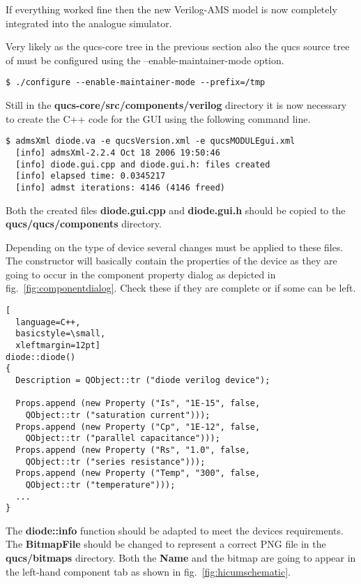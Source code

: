 \addvspace{12pt}

If everything worked fine then the new Verilog-AMS model is now
completely integrated into the analogue simulator.


Very likely as the qucs-core tree in the previous section also the
qucs source tree of must be configured using the
--enable-maintainer-mode option.
\begin{Verbatim}[fontsize=\small]
  $ ./configure --enable-maintainer-mode --prefix=/tmp
\end{Verbatim}

Still in the \textbf{qucs-core/src/components/verilog} directory it is
now necessary to create the C++ code for the GUI using the following
command line.

\begin{Verbatim}[fontsize=\small]
  $ admsXml diode.va -e qucsVersion.xml -e qucsMODULEgui.xml
  [info] admsXml-2.2.4 Oct 18 2006 19:50:46
  [info] diode.gui.cpp and diode.gui.h: files created
  [info] elapsed time: 0.0345217
  [info] admst iterations: 4146 (4146 freed)
\end{Verbatim}

Both the created files \textbf{diode.gui.cpp} and \textbf{diode.gui.h}
should be copied to the \textbf{qucs/qucs/components} directory.

\addvspace{12pt}

Depending on the type of device several changes must be applied to
these files.  The constructor will basically contain the properties of
the device as they are going to occur in the component property dialog
as depicted in fig.~\ref{fig:componentdialog}.  Check these if they
are complete or if some can be left.
\begin{lstlisting}[
  language=C++,
  basicstyle=\small,
  xleftmargin=12pt]
diode::diode()
{
  Description = QObject::tr ("diode verilog device");

  Props.append (new Property ("Is", "1E-15", false,
    QObject::tr ("saturation current")));
  Props.append (new Property ("Cp", "1E-12", false,
    QObject::tr ("parallel capacitance")));
  Props.append (new Property ("Rs", "1.0", false,
    QObject::tr ("series resistance")));
  Props.append (new Property ("Temp", "300", false,
    QObject::tr ("temperature")));
  ...
}
\end{lstlisting}

The \textbf{diode::info} function should be adapted to meet the
devices requirements.  The \textbf{BitmapFile} should be changed to
represent a correct PNG file in the \textbf{qucs/bitmaps} directory.
Both the \textbf{Name} and the bitmap are going to appear in the
left-hand component tab as shown in fig.~\ref{fig:hicumschematic}.

